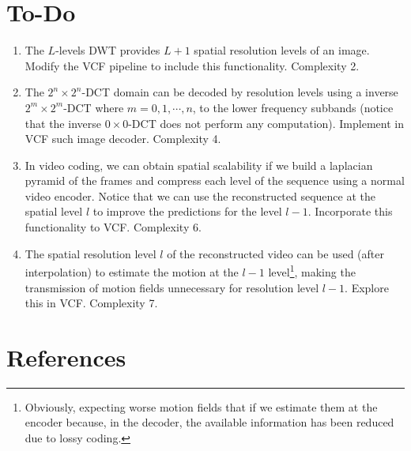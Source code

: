 \section{To-Do}
\begin{enumerate}
\item The $L$-levels DWT provides $L+1$ spatial resolution levels of
  an image. Modify the VCF pipeline to include this
  functionality. Complexity 2.
\item The $2^n\times 2^n$-DCT domain can be decoded by resolution
  levels using a inverse $2^m\times 2^m$-DCT where $m=0,1,\cdots,n$,
  to the lower frequency subbands (notice that the inverse
  $0\times 0$-DCT does not perform any computation). Implement in VCF
  such image decoder. Complexity 4.
\item In video coding, we can obtain spatial scalability if we build a
  laplacian pyramid of the frames and compress each level of the
  sequence using a normal video encoder. Notice that we can use the
  reconstructed sequence at the spatial level $l$ to improve the
  predictions for the level $l-1$. Incorporate this functionality to
  VCF. Complexity 6.
\item The spatial resolution level $l$ of the reconstructed video can
  be used (after interpolation) to estimate the motion at the $l-1$
  level\footnote{Obviously, expecting worse motion fields that if we
    estimate them at the encoder because, in the decoder, the
    available information has been reduced due to lossy coding.},
  making the transmission of motion fields unnecessary for resolution
  level $l-1$. Explore this in VCF. Complexity 7.
\end{enumerate}

\section{References}

\renewcommand{\addcontentsline}[3]{}%

